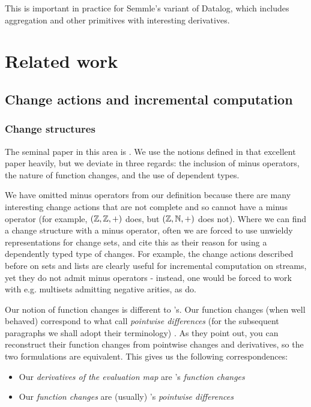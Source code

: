 This is important in practice for Semmle's variant of Datalog, which includes
aggregation and other primitives with interesting derivatives. 

\section{Related work}

\subsection{Change actions and incremental computation}

\subsubsection{Change structures}
\label{sec:relatedChangeStructures}

The seminal paper in this area is \textcite{cai2014changes}. We use the notions
defined in that excellent paper heavily, but we deviate in three regards: the
inclusion of minus operators, the nature of function changes, and the use of
dependent types.

We have omitted minus operators from our definition because
there are many interesting change actions that are not complete and so cannot
have a minus operator (for example, $(\mathbb{Z},\mathbb{Z},+)$ does, but $(\mathbb{Z},\mathbb{N},+)$ does
not). Where we can find a change structure with a minus operator, often we are
forced to use unwieldy representations for change sets, and
\citeauthor{cai2014changes} cite this as their reason for using a dependently
typed type of changes. For example, the change actions described before on sets and lists are clearly
useful for incremental computation on streams, yet they do not admit minus operators - instead, one would
be forced to work with e.g. multisets admitting negative arities, as \citeauthor{cai2014changes} do.

Our notion of function changes is different to \citeauthor{cai2014changes}'s.
Our function changes (when well behaved) correspond to what \citeauthor{cai2014changes} call
\emph{pointwise differences} (for the subsequent paragraphs we shall adopt
their terminology) \autocite[See][section 2.2]{cai2014changes}. As they point out, you can reconstruct their
function changes from pointwise changes and derivatives, so the two formulations
are equivalent. This gives us the following correspondences:
\begin{itemize}
  \item Our \emph{derivatives of the evaluation map} are \citeauthor{cai2014changes}'s \emph{function changes}
  \item Our \emph{function changes} are (usually) \citeauthor{cai2014changes}'s \emph{pointwise differences}
\end{itemize}

